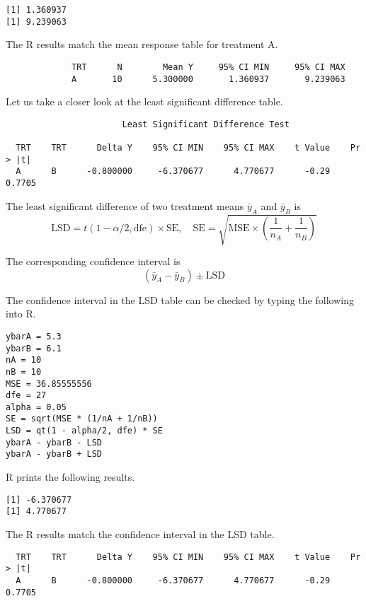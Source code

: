 \documentclass[12pt]{article}
\begin{document}
{\footnotesize\begin{verbatim}
[1] 1.360937
[1] 9.239063
\end{verbatim}}

The R results match the mean response table for treatment A.

{\footnotesize\begin{verbatim}
             TRT      N        Mean Y     95% CI MIN     95% CI MAX
             A       10      5.300000       1.360937       9.239063
\end{verbatim}}

Let us take a closer look at the least significant difference table.

{\footnotesize\begin{verbatim}
                       Least Significant Difference Test

  TRT    TRT      Delta Y    95% CI MIN    95% CI MAX    t Value    Pr > |t|  
  A      B      -0.800000     -6.370677      4.770677      -0.29      0.7705  
\end{verbatim}}

The least significant difference of two treatment means $\bar y_A$ and $\bar y_B$ is
\begin{equation*}
\text{LSD}=t(1-\alpha/2,\text{dfe})\times\text{SE},
\quad
\text{SE}=\sqrt{\text{MSE}\times\left(\frac{1}{n_A}+\frac{1}{n_B}\right)}
\end{equation*}

The corresponding confidence interval is
\begin{equation*}
(\bar y_A-\bar y_B)\pm\text{LSD}
\end{equation*}

The confidence interval in the LSD table can be checked by typing the following into R.

{\footnotesize\begin{verbatim}
ybarA = 5.3
ybarB = 6.1
nA = 10
nB = 10
MSE = 36.85555556
dfe = 27
alpha = 0.05
SE = sqrt(MSE * (1/nA + 1/nB))
LSD = qt(1 - alpha/2, dfe) * SE
ybarA - ybarB - LSD
ybarA - ybarB + LSD
\end{verbatim}}

R prints the following results.

{\footnotesize\begin{verbatim}
[1] -6.370677
[1] 4.770677
\end{verbatim}}

The R results match the confidence interval in the LSD table.

{\footnotesize\begin{verbatim}
  TRT    TRT      Delta Y    95% CI MIN    95% CI MAX    t Value    Pr > |t|  
  A      B      -0.800000     -6.370677      4.770677      -0.29      0.7705  
\end{verbatim}}
\end{document}
